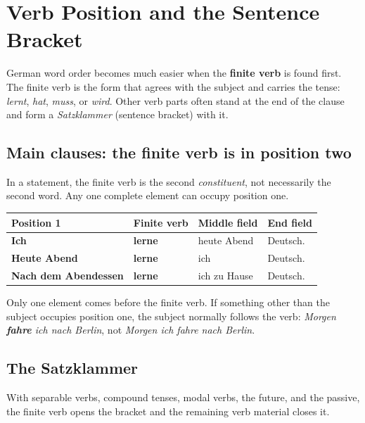 \chapter{Verb Position and the Sentence Bracket}

German word order becomes much easier when the \textbf{finite verb} is found
first. The finite verb is the form that agrees with the subject and carries
the tense: \textit{lernt}, \textit{hat}, \textit{muss}, or \textit{wird}.
Other verb parts often stand at the end of the clause and form a
\textit{Satzklammer} (sentence bracket) with it.

\section{Main clauses: the finite verb is in position two}

In a statement, the finite verb is the second \emph{constituent}, not
necessarily the second word. Any one complete element can occupy position one.

\begin{center}
\small
{}
\begin{tabularx}{\textwidth}{@{}>{\bfseries}l l l X@{}}
\toprule
Position 1 & Finite verb & Middle field & End field \\
\midrule
Ich & \textbf{lerne} & heute Abend & Deutsch. \\
Heute Abend & \textbf{lerne} & ich & Deutsch. \\
Nach dem Abendessen & \textbf{lerne} & ich zu Hause & Deutsch. \\
\bottomrule
\end{tabularx}
\end{center}

Only one element comes before the finite verb. If something other than the
subject occupies position one, the subject normally follows the verb:
\textit{Morgen \textbf{fahre} ich nach Berlin}, not
\textit{Morgen ich fahre nach Berlin}.

\section{The Satzklammer}

With separable verbs, compound tenses, modal verbs, the future, and the
passive, the finite verb opens the bracket and the remaining verb material
closes it.


